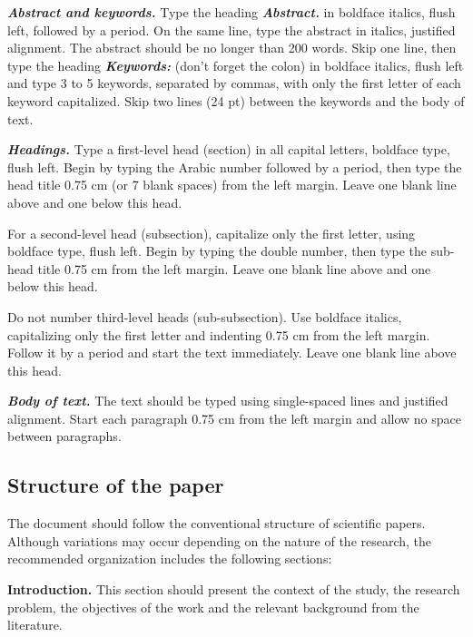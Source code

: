 \documentclass[12pt,fleqn]{article}
\begin{document}
\vspace{0.5cm} %

\textbf{\textit{Abstract and keywords.}} Type the heading \textbf{\textit{Abstract.}} in boldface italics, flush left, followed by a period. On the same line, type the abstract in italics, justified alignment. The abstract should be no longer than 200 words. Skip one line, then type the heading \textbf{\textit{Keywords:}} (don't forget the colon) in boldface italics, flush left and type 3 to 5 keywords, separated by commas, with only the first letter of each keyword capitalized. Skip two lines (24 pt) between the keywords and the body of text.

\vspace{0.5cm} %

\textbf{\textit{Headings.}} Type a first-level head (section) in all capital letters, boldface type, flush left. Begin by typing the Arabic number followed by a period, then type the head title 0.75 cm (or 7 blank spaces) from the left margin. Leave one blank line above and one below this head.

For a second-level head (subsection), capitalize only the first letter, using boldface type, flush left. Begin by typing the double number, then type the sub-head title 0.75 cm from the left margin. Leave one blank line above and one below this head.

Do not number third-level heads (sub-subsection). Use boldface italics, capitalizing only the first letter and indenting 0.75 cm from the left margin. Follow it by a period and start the text immediately. Leave one blank line above this head.

\vspace{0.5cm} %
%
\textbf{\textit{Body of text.}} The text should be typed using single-spaced lines and justified alignment. Start each paragraph 0.75 cm from the left margin and allow no space between paragraphs.

\subsection{Structure of the paper}

The document should follow the conventional structure of scientific papers. Although variations may occur depending on the nature of the research, the recommended organization includes the following sections:

\textbf{Introduction.} This section should present the context of the study, the research problem, the objectives of the work and the relevant background from the literature.
\end{document}
